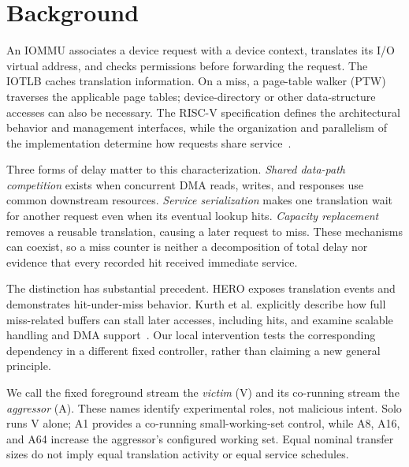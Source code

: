 \section{Background}
An IOMMU associates a device request with a device context, translates its I/O virtual address, and checks permissions before forwarding the request. The IOTLB caches translation information. On a miss, a page-table walker (PTW) traverses the applicable page tables; device-directory or other data-structure accesses can also be necessary. The RISC-V specification defines the architectural behavior and management interfaces, while the organization and parallelism of the implementation determine how requests share service~\cite{riscvIommu}.

Three forms of delay matter to this characterization. \emph{Shared data-path competition} exists when concurrent DMA reads, writes, and responses use common downstream resources. \emph{Service serialization} makes one translation wait for another request even when its eventual lookup hits. \emph{Capacity replacement} removes a reusable translation, causing a later request to miss. These mechanisms can coexist, so a miss counter is neither a decomposition of total delay nor evidence that every recorded hit received immediate service.

The distinction has substantial precedent. HERO exposes translation events and demonstrates hit-under-miss behavior. Kurth et al. explicitly describe how full miss-related buffers can stall later accesses, including hits, and examine scalable handling and DMA support~\cite{hero2017,kurth2018}. Our local intervention tests the corresponding dependency in a different fixed controller, rather than claiming a new general principle.

We call the fixed foreground stream the \emph{victim} (V) and its co-running stream the \emph{aggressor} (A). These names identify experimental roles, not malicious intent. Solo runs V alone; A1 provides a co-running small-working-set control, while A8, A16, and A64 increase the aggressor's configured working set. Equal nominal transfer sizes do not imply equal translation activity or equal service schedules.
